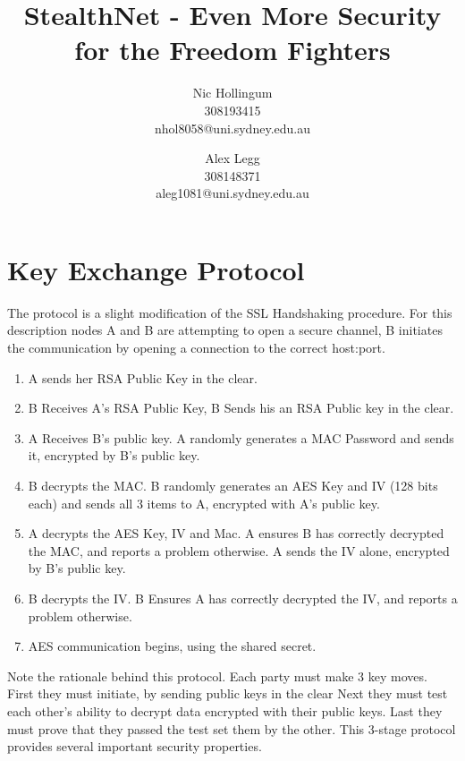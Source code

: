 
\author{
		Nic Hollingum\\
		308193415\\
		nhol8058@uni.sydney.edu.au
	\and
		Alex Legg\\
		308148371\\
		aleg1081@uni.sydney.edu.au
}
\title{StealthNet - Even More Security for the Freedom Fighters}

\addtolength{\oddsidemargin}{-.875in}
\addtolength{\evensidemargin}{-.875in}
\addtolength{\textwidth}{1.75in}
\addtolength{\topmargin}{-1.375in}
\setlength{\topskip}{0mm}
\addtolength{\textheight}{3.5in}
\setlength{\parskip}{0mm}
\setlength{\itemsep}{0mm}


\maketitle

\section{Key Exchange Protocol}
The protocol is a slight modification of the SSL Handshaking procedure. For this description nodes A and B are attempting to open a secure channel, B initiates the communication by opening a connection to the correct host:port.

\begin{enumerate}
	\item A sends her RSA Public Key in the clear.
	\item B Receives A's RSA Public Key, B Sends his an RSA Public key in the clear.
	\item A Receives B's public key. A randomly generates a MAC Password and sends it, encrypted by B's public key.
	\item B decrypts the MAC.  B randomly generates an AES Key and IV (128 bits each) and sends all 3 items to A, encrypted with A's public key.
	\item A decrypts the AES Key, IV and Mac.  A ensures B has correctly decrypted the MAC, and reports a problem otherwise.  A sends the IV alone, encrypted by B's public key.
	\item B decrypts the IV.  B Ensures A has correctly decrypted the IV, and reports a problem otherwise.
	\item AES communication begins, using the shared secret.
\end{enumerate}

Note the rationale behind this protocol.
Each party must make 3 key moves.
First they must initiate, by sending public keys in the clear
Next they must test each other's ability to decrypt data encrypted with their public keys.
Last they must prove that they passed the test set them by the other.
This 3-stage protocol provides several important security properties.


